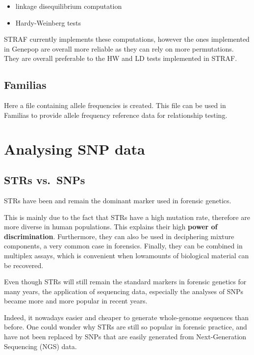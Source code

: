\documentclass[
]{book}
\begin{document}
\begin{itemize}
\item
  linkage disequilibrium computation
\item
  Hardy-Weinberg tests
\end{itemize}

STRAF currently implements these computations, however the ones implemented in
Genepop are overall more reliable as they can rely on more permutations. They
are overall preferable to the HW and LD tests implemented in STRAF.

\hypertarget{familias}{%
\section{Familias}\label{familias}}

Here a file containing allele frequencies is created. This file can be used in
Familias \citep{ref_familias} to provide allele frequency reference
data for relationship testing.

\hypertarget{snp-analysis}{%
\chapter{Analysing SNP data}\label{snp-analysis}}

\hypertarget{strs-vs.-snps}{%
\section{STRs vs.~SNPs}\label{strs-vs.-snps}}

STRs have been and remain the dominant marker used in forensic genetics.

This is mainly due to the fact that STRs have a high mutation rate, therefore
are more diverse in human populations. This explains their high \textbf{power of discrimination}.
Furthermore, they can also be used in deciphering mixture components, a very common
case in forensics. Finally, they can be combined in multiplex assays, which is convenient when lowamounts of biological material can be recovered.

Even though STRs will still remain the standard markers in forensic genetics
for many years, the application of sequencing data, especially the analyses
of SNPs became more and more popular in recent years.

Indeed, it nowadays easier and cheaper to generate whole-genome sequences than before.
One could wonder why STRs are still so popular in forensic practice, and have not been replaced by SNPs that are easily generated from Next-Generation Sequencing (NGS) data.
\end{document}

